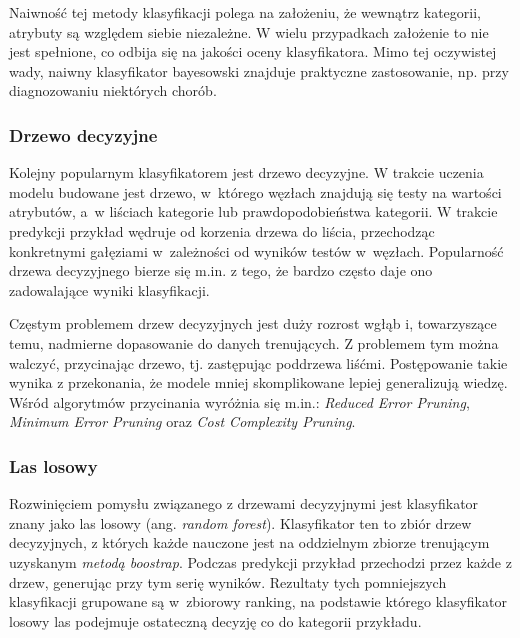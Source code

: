 \documentclass[../thesis.tex]{subfiles}
\begin{document}
Naiwność tej metody klasyfikacji polega na założeniu, że wewnątrz kategorii, atrybuty są względem siebie niezależne. W wielu przypadkach założenie to nie jest spełnione, co odbija się na jakości oceny klasyfikatora. Mimo tej oczywistej wady, naiwny klasyfikator bayesowski znajduje praktyczne zastosowanie, np. przy diagnozowaniu niektórych chorób.

\subsubsection{Drzewo decyzyjne}

Kolejny popularnym klasyfikatorem jest drzewo decyzyjne. W trakcie uczenia modelu budowane jest drzewo, w~którego węzłach znajdują się testy na wartości atrybutów, a~w liściach kategorie lub prawdopodobieństwa kategorii. W trakcie predykcji przykład wędruje od korzenia drzewa do liścia, przechodząc konkretnymi gałęziami w~zależności od wyników testów w~węzłach. Popularność drzewa decyzyjnego bierze się m.in. z tego, że bardzo często daje ono zadowalające wyniki klasyfikacji. 

Częstym problemem drzew decyzyjnych jest duży rozrost wgłąb i, towarzyszące temu, nadmierne dopasowanie do danych trenujących. Z problemem tym można walczyć, przycinając drzewo, tj. zastępując poddrzewa liśćmi. Postępowanie takie wynika z przekonania, że modele mniej skomplikowane lepiej generalizują wiedzę. Wśród algorytmów przycinania wyróżnia się m.in.: \emph{Reduced Error Pruning}, \emph{Minimum Error Pruning} oraz \emph{Cost Complexity Pruning}.

\subsubsection{Las losowy}

Rozwinięciem pomysłu związanego z drzewami decyzyjnymi jest klasyfikator znany jako las losowy (ang. \emph{random forest}). Klasyfikator ten to zbiór drzew decyzyjnych, z których każde nauczone jest na oddzielnym zbiorze trenującym uzyskanym \emph{metodą boostrap}. Podczas predykcji przykład przechodzi przez każde z drzew, generując przy tym serię wyników. Rezultaty tych pomniejszych klasyfikacji grupowane są w~zbiorowy ranking, na podstawie którego klasyfikator losowy las podejmuje ostateczną decyzję co do kategorii przykładu.
\end{document}
